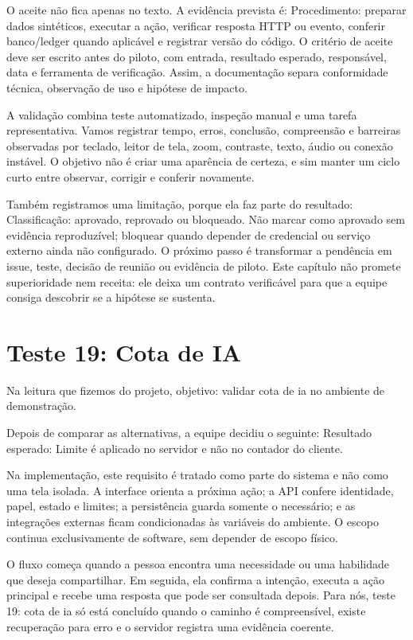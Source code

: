 \documentclass[12pt,oneside,a4paper,article]{abntex2}
\begin{document}
O aceite não fica apenas no texto. A evidência prevista é: Procedimento: preparar dados sintéticos, executar a ação, verificar resposta HTTP ou evento, conferir banco/ledger quando aplicável e registrar versão do código. O critério de aceite deve ser escrito antes do piloto, com entrada, resultado esperado, responsável, data e ferramenta de verificação. Assim, a documentação separa conformidade técnica, observação de uso e hipótese de impacto.

A validação combina teste automatizado, inspeção manual e uma tarefa representativa. Vamos registrar tempo, erros, conclusão, compreensão e barreiras observadas por teclado, leitor de tela, zoom, contraste, texto, áudio ou conexão instável. O objetivo não é criar uma aparência de certeza, e sim manter um ciclo curto entre observar, corrigir e conferir novamente.

Também registramos uma limitação, porque ela faz parte do resultado: Classificação: aprovado, reprovado ou bloqueado. Não marcar como aprovado sem evidência reproduzível; bloquear quando depender de credencial ou serviço externo ainda não configurado. O próximo passo é transformar a pendência em issue, teste, decisão de reunião ou evidência de piloto. Este capítulo não promete superioridade nem receita: ele deixa um contrato verificável para que a equipe consiga descobrir se a hipótese se sustenta.

\section{Teste 19: Cota de IA}
Na leitura que fizemos do projeto, objetivo: validar cota de ia no ambiente de demonstração.

Depois de comparar as alternativas, a equipe decidiu o seguinte: Resultado esperado: Limite é aplicado no servidor e não no contador do cliente.

Na implementação, este requisito é tratado como parte do sistema e não como uma tela isolada. A interface orienta a próxima ação; a API confere identidade, papel, estado e limites; a persistência guarda somente o necessário; e as integrações externas ficam condicionadas às variáveis do ambiente. O escopo continua exclusivamente de software, sem depender de escopo físico.

O fluxo começa quando a pessoa encontra uma necessidade ou uma habilidade que deseja compartilhar. Em seguida, ela confirma a intenção, executa a ação principal e recebe uma resposta que pode ser consultada depois. Para nós, teste 19: cota de ia só está concluído quando o caminho é compreensível, existe recuperação para erro e o servidor registra uma evidência coerente.
\end{document}
